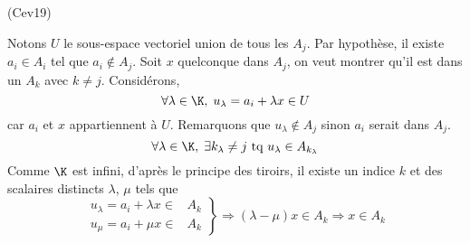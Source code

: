 \begin{tiny}(Cev19)\end{tiny} Notons $U$ le sous-espace vectoriel union de tous les $A_j$.
Par hypothèse, il existe $a_i\in A_i$ tel que $a_i\notin A_j$.\newline
Soit $x$ quelconque dans $A_j$, on veut montrer qu'il est dans un $A_k$ avec $k\neq j$.\newline
Considérons, 
\begin{displaymath}
\forall \lambda\in \K, \;  u_\lambda = a_i + \lambda x \in U
\end{displaymath}
car $a_i$ et $x$ appartiennent à $U$.\newline
Remarquons que $u_\lambda \notin A_j$ sinon $a_i$ serait dans $A_j$. 
\begin{displaymath}
\forall \lambda \in \K,\;  \exists k_\lambda \neq j \text{ tq } u_\lambda \in A_{k_\lambda}
\end{displaymath}
Comme $\K$ est infini, d'après le principe des tiroirs, il existe un indice $k$ et des scalaires distincts $\lambda$, $\mu$ tels que
\begin{displaymath}
  \left. 
  \begin{aligned}
    u_\lambda = a_i + \lambda x \in& A_k \\ u_\mu = a_i + \mu x \in& A_k
  \end{aligned}
\right\rbrace 
\Rightarrow 
(\lambda - \mu)x \in A_k \Rightarrow x\in A_k
\end{displaymath}


